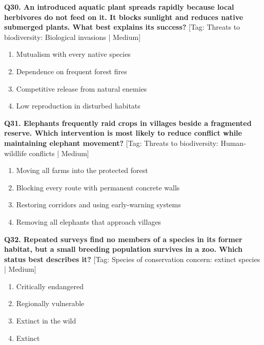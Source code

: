 \noindent\textbf{Q30. An introduced aquatic plant spreads rapidly because local herbivores do not feed on it. It blocks sunlight and reduces native submerged plants. What best explains its success?} \hfill [Tag: Threats to biodiversity: Biological invasions | Medium]
\begin{enumerate}[label=(\alph*),topsep=2pt,itemsep=1pt,partopsep=0pt,parsep=0pt]
    \item {Mutualism with every native species}
    \item {Dependence on frequent forest fires}
    \item {Competitive release from natural enemies}
    \item {Low reproduction in disturbed habitats}
\end{enumerate}
\vspace{2mm}

\noindent\textbf{Q31. Elephants frequently raid crops in villages beside a fragmented reserve. Which intervention is most likely to reduce conflict while maintaining elephant movement?} \hfill [Tag: Threats to biodiversity: Human-wildlife conflicts | Medium]
\begin{enumerate}[label=(\alph*),topsep=2pt,itemsep=1pt,partopsep=0pt,parsep=0pt]
    \item {Moving all farms into the protected forest}
    \item {Blocking every route with permanent concrete walls}
    \item {Restoring corridors and using early-warning systems}
    \item {Removing all elephants that approach villages}
\end{enumerate}
\vspace{2mm}

\noindent\textbf{Q32. Repeated surveys find no members of a species in its former habitat, but a small breeding population survives in a zoo. Which status best describes it?} \hfill [Tag: Species of conservation concern: extinct species | Medium]
\begin{enumerate}[label=(\alph*),topsep=2pt,itemsep=1pt,partopsep=0pt,parsep=0pt]
    \item {Critically endangered}
    \item {Regionally vulnerable}
    \item {Extinct in the wild}
    \item {Extinct}
\end{enumerate}
\vspace{2mm}

